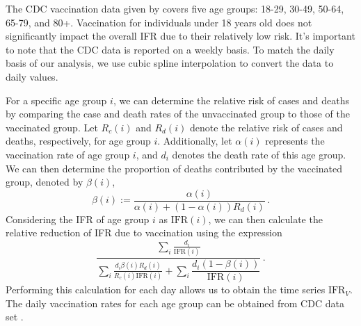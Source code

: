 \documentclass[sn-mathphys,Numbered]{sn-jnl}
\begin{document}
The CDC vaccination data given by covers five age groups: 18-29, 30-49, 50-64, 65-79, and 80+. Vaccination for individuals under 18 years old does not significantly impact the overall IFR due to their relatively low risk. It's important to note that the CDC data is reported on a weekly basis. To match the daily basis of our analysis, we use cubic spline interpolation to convert the data to daily values.

For a specific age group $i$, we can determine the relative risk of cases and deaths by comparing the case and death rates of the unvaccinated group to those of the vaccinated group. Let $R_c(i)$ and $R_d(i)$ denote the relative risk of cases and deaths, respectively, for age group $i$. Additionally, let $\alpha(i)$ represents the vaccination rate of age group $i$, and $d_i$ denotes the death rate of this age group. We can then determine the proportion of deaths contributed by the vaccinated group, denoted by $\beta(i)$,
$$
\beta (i):= \frac{\alpha (i)}{\alpha (i) + (1 - \alpha (i))R_d(i) }\,.
$$
Considering the IFR of age group $i$ as $\mathrm{IFR}(i)$, we can then calculate the relative reduction of IFR due to vaccination using the expression
\begin{equation*}
\frac{\displaystyle\sum_{i} \frac{d_i }{ \mathrm{IFR}(i)} }{\displaystyle\sum_{i} \frac{d_i \beta (i) R_d (i)}{R_c (i) \mathrm{IFR}(i)} + \sum_{i} \dfrac{d_i (1 - \beta (i) )}{ \mathrm{IFR}(i) } } \,.
\end{equation*}
Performing this calculation for each day allows us to obtain the time series $\mathrm{IFR}_V$. The daily vaccination rates for each age group can be obtained from CDC data set \cite{CDCvacrate}. 





\end{document}

